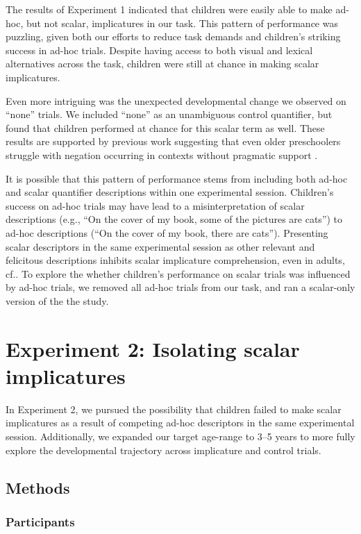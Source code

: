 \documentclass[man]{apa2}
\begin{document}
The results of Experiment 1 indicated that children were easily able to make ad-hoc, but not scalar, implicatures in our task. This pattern of performance was puzzling, given both our efforts to reduce task demands and children's striking success in ad-hoc trials. Despite having access to both visual and lexical alternatives across the task, children were still at chance in making scalar implicatures. 

Even more intriguing was the unexpected developmental change we observed on ``none'' trials. We included ``none'' as an unambiguous control quantifier, but found that children performed at chance for this scalar term as well. These results are supported by previous work suggesting that even older preschoolers struggle with negation occurring in contexts without pragmatic support \cite{nordmeyer2014}. 

It is possible that this pattern of performance stems from including both ad-hoc and scalar quantifier descriptions within one experimental session. Children's success on ad-hoc trials may have lead to a misinterpretation of  scalar descriptions (e.g., ``On the cover of my book, some of the pictures are cats'') to ad-hoc descriptions (``On the cover of my book, there are cats''). Presenting scalar descriptors in the same experimental session as other relevant and felicitous descriptions inhibits scalar implicature comprehension, even in adults, cf.\cite{degenalt2015}. To explore the whether children's performance on scalar trials was influenced by ad-hoc trials, we removed all ad-hoc trials from our task, and ran a scalar-only version of the the study.

\section{Experiment 2: Isolating scalar implicatures}
In Experiment 2, we pursued the possibility that children failed to make scalar implicatures as a result of competing ad-hoc descriptors in the same experimental session. Additionally, we expanded our target age-range to 3--5 years to more fully explore the developmental trajectory across implicature and control trials.

\subsection{Methods}
\subsubsection{Participants} 
\end{document}
